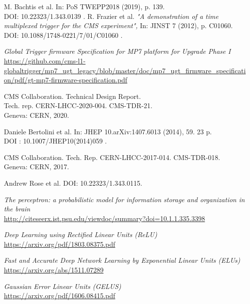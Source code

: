 \begin{thebibliography}{99}
M. Bachtis et al.
In: PoS TWEPP2018 (2019), p. 139. \\
DOI: 10.22323/1.343.0139 .
R. Frazier et al.
\textit{"A demonstration of a time multiplexed trigger for the CMS experiment",}
In: JINST 7 (2012), p. C01060.
DOI: 10.1088/1748-0221/7/01/C01060 .

\textit{Global Trigger firmware Specification for MP7 platform for Upgrade Phase I}
\\\url{https://github.com/cms-l1-globaltrigger/mp7_ugt_legacy/blob/master/doc/mp7_ugt_firmware_specification/pdf/gt-mp7-firmware-specification.pdf}

CMS Collaboration.
Technical Design Report. \\
Tech. rep. CERN-LHCC-2020-004. CMS-TDR-21. \\
Geneva: CERN, 2020.

Daniele Bertolini et al.
In: JHEP 10.arXiv:1407.6013 (2014), 59. 23 p. \\
DOI : 10.1007/JHEP10(2014)059 .

CMS Collaboration.
Tech. Rep. CERN-LHCC-2017-014. CMS-TDR-018. \\
Geneva: CERN, 2017.

Andrew Rose et al.
DOI: 10.22323/1.343.0115.

\textit{The perceptron: a probabilistic model for information storage and organization in the brain}
\\\url{http://citeseerx.ist.psu.edu/viewdoc/summary?doi=10.1.1.335.3398}

\textit{Deep Learning using Rectified Linear Units (ReLU)}
\\\url{https://arxiv.org/pdf/1803.08375.pdf}

\textit{Fast and Accurate Deep Network Learning by Exponential Linear Units (ELUs)}
\\\url{https://arxiv.org/abs/1511.07289}

\textit{Gaussian Error Linear Units (GELUS)}
\\\url{https://arxiv.org/pdf/1606.08415.pdf}


\end{thebibliography}
